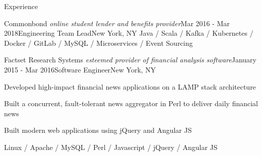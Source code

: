 \documentclass{resume} %
\begin{document}
\begin{rSection}{Experience}
\begin{rSubsection}{Commonbond \textit{\scriptsize online student lender and benefits provider}}{Mar 2016 - Mar 2018}{Engineering Team Lead}{New York, NY}
Java / Scala / Kafka / Kubernetes / Docker / GitLab / MySQL / Microservices / Event Sourcing
\end{rSubsection}


\begin{rSubsection}{Factset Research Systems \textit{\scriptsize esteemed provider of financial analysis software}}{January 2015 - Mar 2016}{Software Engineer}{New York, NY}
\item Developed high-impact financial news applications on a LAMP stack architecture
\item Built a concurrent, fault-tolerant news aggregator in Perl to deliver daily financial news
\item Built modern web applications using jQuery and Angular JS
\end{rSubsection}

Linux / Apache / MySQL / Perl / Javascript / jQuery / Angular JS
\end{rSection}





\end{document}
